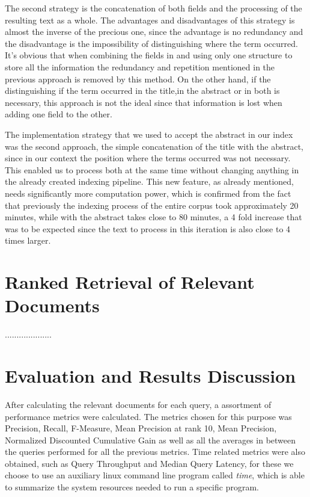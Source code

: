 \documentclass[12pt]{article}
\begin{document}
The second strategy is the concatenation of both fields and the processing of the resulting text as a whole. The advantages and disadvantages of this strategy is almost the inverse of the precious one, since the advantage is no redundancy and the disadvantage is the impossibility of distinguishing where the term occurred. It's obvious that when combining the fields in and using only one structure to store all the information the redundancy and repetition mentioned in the previous approach is removed by this method. On the other hand, if the distinguishing if the term occurred in the title,in the abstract or in both is necessary, this approach is not the ideal since that information is lost when adding one field to the other.

The implementation strategy that we used to accept the abstract in our index was the second approach, the simple concatenation of the title with the abstract, since in our context the position where the terms occurred was not necessary. This enabled us to process both at the same time without changing anything in the already created indexing pipeline. This new feature, as already mentioned, needs significantly more computation power, which is confirmed from the fact that previously the indexing process of the entire corpus took approximately 20 minutes, while with the abstract takes close to 80 minutes, a 4 fold increase that was to be expected since the text to process in this iteration is also close to 4 times larger.

\section{Ranked Retrieval of Relevant Documents}

....................

\section{Evaluation and Results Discussion}
After calculating the relevant documents for each query, a assortment of performance metrics were calculated. The metrics chosen for this purpose was Precision, Recall, F-Measure, Mean Precision at rank 10, Mean Precision, Normalized Discounted Cumulative Gain as well as all the averages in between the queries performed for all the previous metrics. Time related metrics were also obtained, such as Query Throughput and Median Query Latency, for these we choose to use an auxiliary linux command line program called \textit{time}, which is able to summarize the system resources needed to run a specific program.
\end{document}
